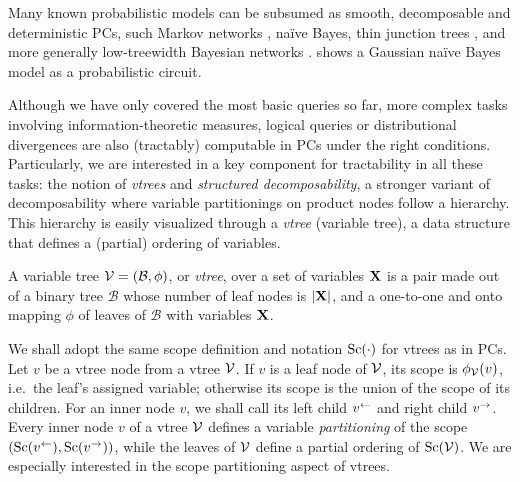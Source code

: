 Many known probabilistic models can be subsumed as smooth, decomposable and deterministic PCs, such
Markov networks \citep{lowd13a}, naïve Bayes, thin junction trees \citep{bach01}, and more
generally low-treewidth Bayesian networks \citep{darwiche03}.  shows a Gaussian
naïve Bayes model as a probabilistic circuit.

Although we have only covered the most basic queries so far, more complex tasks involving
information-theoretic measures, logical queries or distributional divergences are also (tractably)
computable in PCs under the right conditions. Particularly, we are interested in a key component
for tractability in all these tasks: the notion of \emph{vtrees} and \emph{structured
decomposability}, a stronger variant of decomposability where variable partitionings on product
nodes follow a hierarchy. This hierarchy is easily visualized through a \emph{vtree} (variable
tree), a data structure that defines a (partial) ordering of variables.

\begin{definition}[Vtree]
  A variable tree $\operatorname{\mathcal{V}}=(\mathcal{B},\phi)$, or \emph{vtree}, over a set of variables $\mathbf{X}$
  is a pair made out of a binary tree $\mathcal{B}$ whose number of leaf nodes is $|\mathbf{X}|$, and
  a one-to-one and onto mapping $\phi$ of leaves of $\mathcal{B}$ with variables $\mathbf{X}$.
\end{definition}

We shall adopt the same scope definition and notation $\operatorname*{\normalfont{Sc}}(\cdot)$ for vtrees as in PCs. Let $v$ be
a vtree node from a vtree $\operatorname{\mathcal{V}}$. If $v$ is a leaf node of $\operatorname{\mathcal{V}}$, its scope is
$\phi_{\operatorname{\mathcal{V}}}(v)$, i.e.\ the leaf's assigned variable; otherwise its scope is the union of the
scope of its children. For an inner node $v$, we shall call its left child $v^\gets$ and right
child $v^\to$. Every inner node $v$ of a vtree $\operatorname{\mathcal{V}}$ defines a variable \emph{partitioning} of
the scope $(\operatorname*{\normalfont{Sc}}(v^\gets), \operatorname*{\normalfont{Sc}}(v^\to))$, while the leaves of $\operatorname{\mathcal{V}}$ define a partial ordering of
$\operatorname*{\normalfont{Sc}}(\operatorname{\mathcal{V}})$. We are especially interested in the scope partitioning aspect of vtrees.

